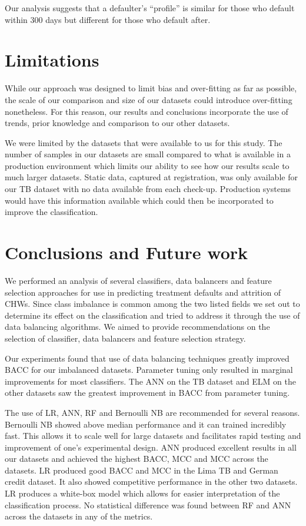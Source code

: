 \documentclass{sig-alternate-05-2015}
\begin{document}
	Our analysis suggests that a defaulter's ``profile'' is similar for those who default within 300 days but different for those who default after.	
	
	\section{ Limitations}
	\label{sec:limitations}
	While our approach was designed to limit bias and over-fitting as far as possible, the scale of our comparison and size of our datasets could introduce over-fitting nonetheless. For this reason, our results and conclusions incorporate the use of trends, prior knowledge and comparison to our other datasets. 
	
	We were limited by the datasets that were available to us for this study. The number of samples in our datasets are small compared to what is available in a production environment which limits our ability to see how our results scale to much larger datasets. Static data, captured at registration, was only available for our TB dataset with no data available from each check-up. Production systems would have this information available which could then be incorporated to improve the classification.
	
	\section{Conclusions and Future work} 
	We performed an analysis of several classifiers, data balancers and feature selection approaches for use in predicting treatment defaults and attrition of CHWs. Since class imbalance is common among the two listed fields we set out to determine its effect on the classification and tried to address it through the use of data balancing algorithms. We aimed to provide recommendations on the selection of classifier, data balancers and feature selection strategy.
	
	Our experiments found that use of data balancing techniques greatly improved BACC for our imbalanced datasets. Parameter tuning only resulted in marginal improvements for most classifiers. The ANN on the TB dataset and ELM on the other datasets saw the greatest improvement in BACC from parameter tuning.
	
	The use of LR, ANN, RF and Bernoulli NB are recommended for several reasons. Bernoulli NB showed above median performance and it can trained incredibly fast. This allows it to scale well for large datasets and facilitates rapid testing and improvement of one's experimental design. ANN produced excellent results in all our datasets and achieved the highest BACC, MCC and MCC across the datasets. LR produced good BACC and MCC in the Lima TB and German credit dataset. It also showed competitive performance in the other two datasets. LR produces a white-box model which allows for easier interpretation of the classification process. No statistical difference was found between RF and ANN across the datasets in any of the metrics.
	
\end{document}
